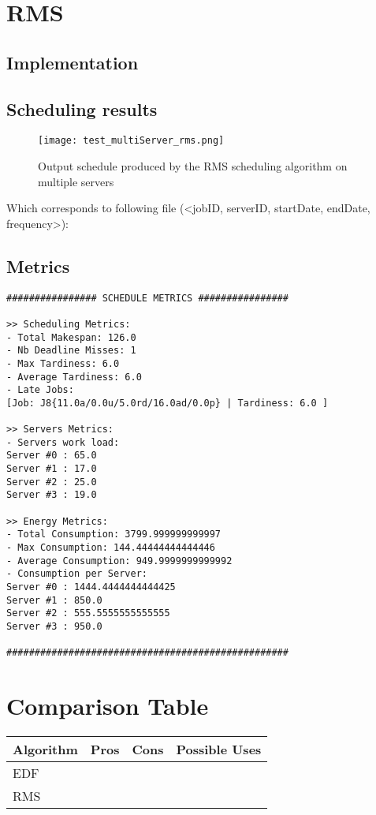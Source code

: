 \documentclass[./report.tex]{subfiles}
\begin{document}
\newpage
\section{RMS}
\subsection{Implementation}

\subsection{Scheduling results}
\begin{figure}[!h]
	\center
	\texttt{[image: test\_multiServer\_rms.png]}
	\caption{Output schedule produced by the RMS scheduling algorithm on multiple servers}
	\label{fig:multiServer_rms} 
\end{figure}

Which corresponds to following file (<jobID, serverID, startDate, endDate, frequency>):


\newpage
\subsection{Metrics}
\begin{lstlisting}[style=txt, caption={Metrics for RMS on multiple servers}]
################ SCHEDULE METRICS ################

>> Scheduling Metrics: 
- Total Makespan: 126.0
- Nb Deadline Misses: 1
- Max Tardiness: 6.0
- Average Tardiness: 6.0
- Late Jobs: 
[Job: J8{11.0a/0.0u/5.0rd/16.0ad/0.0p} | Tardiness: 6.0 ]

>> Servers Metrics: 
- Servers work load:
Server #0 : 65.0
Server #1 : 17.0
Server #2 : 25.0
Server #3 : 19.0

>> Energy Metrics: 
- Total Consumption: 3799.999999999997
- Max Consumption: 144.44444444444446
- Average Consumption: 949.9999999999992
- Consumption per Server: 
Server #0 : 1444.4444444444425
Server #1 : 850.0
Server #2 : 555.5555555555555
Server #3 : 950.0

##################################################
\end{lstlisting}


\newpage
\section{Comparison Table}

\begin{tabular}{|m{8em}|m{12em}|m{12em}|m{12em}|} 
	\hline 
	\textbf{Algorithm} & \textbf{Pros} & \textbf{Cons} & \textbf{Possible Uses} \\ 
	\hline
	EDF &  &  & \\
	\hline
	RMS &  &  & \\
	\hline
\end{tabular}
\end{document}
